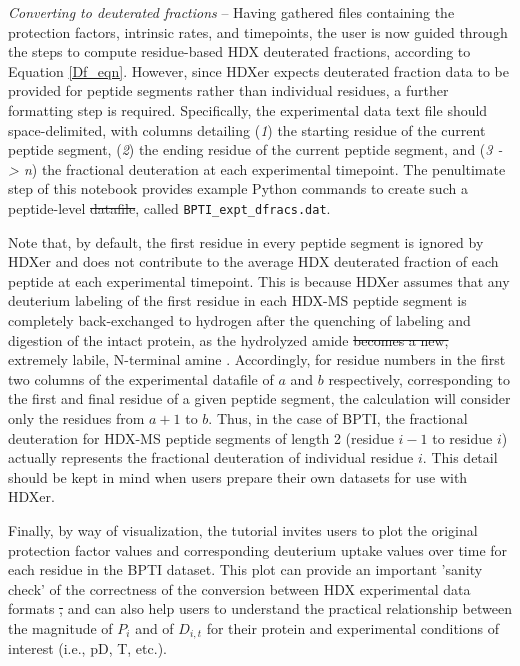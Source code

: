 \documentclass[9pt,tutorial]{livecoms}
\providecommand{\DIFadd}[1]{{\protect\color{blue}\uwave{#1}}} %
\providecommand{\DIFdel}[1]{{\protect\color{red}\sout{#1}}}                      %
\providecommand{\DIFaddbegin}{} %
\providecommand{\DIFaddend}{} %
\providecommand{\DIFdelbegin}{} %
\providecommand{\DIFdelend}{} %
\begin{document}
\noindent 
\textit{Converting to deuterated fractions} -- Having gathered files containing the protection factors, intrinsic rates, and timepoints, the user is now guided through the steps to compute residue-based HDX deuterated fractions, according to Equation \ref{Df_eqn}.
However, since HDXer expects deuterated fraction data to be provided for peptide segments rather than individual residues, a further formatting step is required.
Specifically, the experimental data text file should space-delimited, with columns detailing (\textit{1}) the starting residue of the current peptide segment, (\textit{2}) the ending residue of the current peptide segment, and (\textit{3 -> n}) the fractional deuteration at each experimental timepoint.
The penultimate step of this notebook provides example Python commands to create such a peptide-level \DIFdelbegin \DIFdel{datafile}\DIFdelend \DIFaddbegin \DIFadd{data file}\DIFaddend , called \texttt{BPTI\_expt\_dfracs.dat}.

Note that, by default, the first residue in every peptide segment is ignored by HDXer and does not contribute to the average HDX deuterated fraction of each peptide at each experimental timepoint.
This is because HDXer assumes that any deuterium labeling of the first residue in each HDX-MS peptide segment is completely back-exchanged to hydrogen after the quenching of labeling and digestion of the intact protein, as the hydrolyzed amide \DIFdelbegin \DIFdel{becomes a new, }\DIFdelend \DIFaddbegin \DIFadd{is converted to an }\DIFaddend extremely labile, N-terminal amine \DIFaddbegin \DIFadd{\mbox{%
\cite{Bai1993, Walters2012}}\hspace{0pt}%
}\DIFaddend .
Accordingly, for residue numbers in the first two columns of the experimental datafile of $a$ and $b$ respectively, corresponding to the first and final residue of a given peptide segment, the calculation will consider only the residues from $a+1$ to $b$.
Thus, in the case of BPTI, the fractional deuteration for HDX-MS peptide segments of length 2 (residue $i-1$ to residue $i$) actually represents the fractional deuteration of individual residue $i$.
This detail should be kept in mind when users prepare their own datasets for use with HDXer.

Finally, by way of visualization, the tutorial invites users to plot the original protection factor values and corresponding deuterium uptake values over time for each residue in the BPTI dataset.
This plot can provide an important 'sanity check' of the correctness of the conversion between HDX experimental data formats \DIFdelbegin \DIFdel{, }\DIFdelend and can also help users to understand the practical relationship between the magnitude of $P_i$ and of $D_{i,t}$ for their protein and experimental conditions of interest (i.e., pD, T, etc.).
\end{document}
